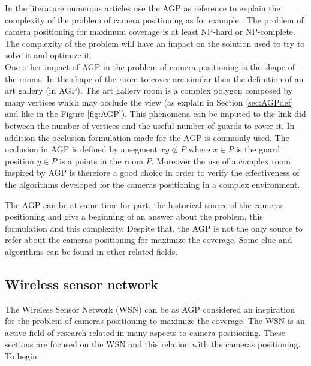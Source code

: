 In the literature numerous articles use the AGP as reference to explain the complexity of the problem of camera positioning as for example \cite{26*moeini,44*chvatal1975,149*mavrinac2013,151*zhao2013}. The problem of camera positioning for maximum coverage is at least NP-hard or NP-complete. 
The complexity of the problem will have an impact on the solution used  to try to solve it and optimize it.\\
One other impact of AGP in the problem of camera positioning is the shape of the rooms. In \cite{170*yabuta2008,171*horster2006,33*reddy2012,43*erdem2006} the shape of the room to cover are similar then the definition of an art gallery (in AGP). The art gallery room is a complex polygon composed by many vertices which may occlude the view (as explain in Section \ref{sec:AGPdef} and like in the Figure \ref{fig:AGP}). This phenomena can be imputed to the link did between the number of vertices and the useful number of guards to cover it. 
In addition the occlusion formulation made for the AGP is commonly used.
The occlusion in AGP is defined  by  a segment $xy \not\subset P$   where $x \in P$ is the guard position $y \in P$ is a points in the room $P$. 
Moreover the use of a complex room inspired by AGP is therefore a good choice in order to verify the effectiveness of the algorithms developed for the cameras positioning in a complex environment.


The AGP can be at same time for part, the  historical source of the cameras positioning and give a beginning of an answer about the problem, this formulation and this complexity. Despite that, the AGP is not the only source to refer about the cameras positioning for maximize the coverage. Some clue and algorithms can be found in other related fields. 


\subsection{Wireless sensor network }\label{sec:WSNstateOfArt}

The Wireless Sensor Network (WSN) can be as AGP considered an inspiration for the problem of cameras positioning to maximize the coverage. The WSN is an active field of research related in many aspects to camera positioning. These sections are focused on the WSN and this relation with the cameras positioning.\\  To begin:

